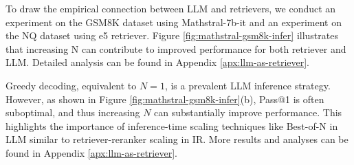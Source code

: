 To draw the empirical connection between LLM and retrievers, we conduct an experiment on the GSM8K dataset \citep{cobbe2021training} using Mathstral-7b-it \citep{mathstral2025} and an experiment on the NQ dataset \citep{kwiatkowski2019natural} using e5 retriever.
Figure \ref{fig:mathstral-gsm8k-infer} illustrates that increasing N can contribute to improved performance for both retriever and LLM. Detailed analysis can be found in Appendix \ref{apx:llm-as-retriever}.


Greedy decoding, equivalent to $N=1$, is a prevalent LLM inference strategy. 
However, as shown in Figure \ref{fig:mathstral-gsm8k-infer}(b), Pass@1 is often suboptimal, and thus increasing $N$ can substantially improve performance. 
This highlights the importance of inference-time scaling techniques like Best-of-N \citep{stiennon2020learning} in LLM similar to retriever-reranker scaling \citep{zhuang2023rankt5} in IR.
More results and analyses can be found in Appendix \ref{apx:llm-as-retriever}.
